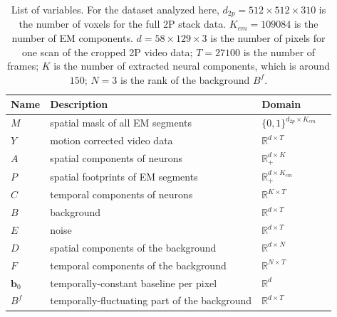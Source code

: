 \documentclass[10pt,letterpaper]{article}
\begin{document}
{\begin{table}
\centering 
\begin{tabular}{llll}
\toprule
\cmidrule{1-2}
Name & Description & Domain \\
\midrule
$M$ & spatial mask of all EM segments & $\{0, 1\}^{d_{2p}\times K_{em}}$\\
$Y$ & motion corrected video data & $\mathbb{R}^{d\times T}$\\
$A$ & spatial components of neurons & $\mathbb{R}_+^{d\times K}$\\
$P$ & spatial footprints of EM segments& $\mathbb{R}_+^{d\times K_{em}}$\\
$C$ & temporal components of neurons&$\mathbb{R}^{K\times T}$ \\
$B$ & background & $\mathbb{R}^{d\times T}$\\
$E$ & noise  & $\mathbb{R}^{d\times T}$\\
$D$ & spatial components of the background &$ \mathbb{R}^{d\times N}$\\
$F$ & temporal components of the background & $\mathbb{R}^{N\times T}$\\
$\bm{b}_0$ & temporally-constant baseline per pixel &$ \mathbb{R}^{d} $\\
$B^f$ & temporally-fluctuating part of the background &$ \mathbb{R}^{d \times T} $\\
\bottomrule
\end{tabular}
\caption{List of variables.  For the dataset analyzed here, $d_{2p}=512\times 512\times 310$ is the number of voxels for the full 2P stack data. $K_{em}=109084$ is the number of EM components. $d=58\times 129\times 3$ is the number of pixels for one scan of the cropped 2P video data; $T=27100$ is the number of frames; $K$ is the number of extracted neural components, which is around $150$; $N=3$ is the rank of the background $B^f$.}
\label{table:variables}
\end{table}

}
\end{document}
